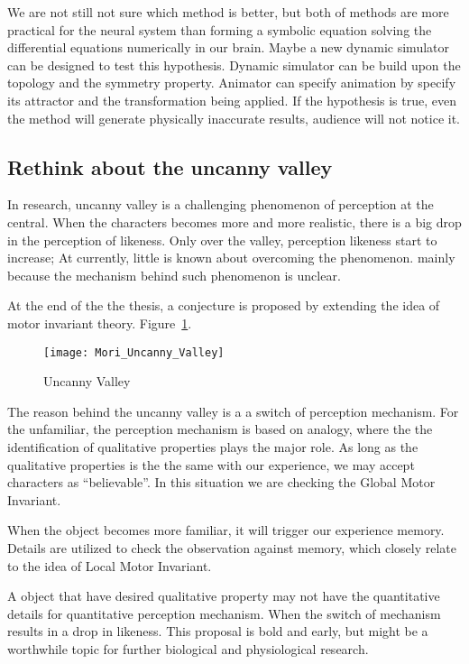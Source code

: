 We are not still not sure which method is better, but both of methods are more practical for the neural system than forming a symbolic equation solving the differential equations numerically in our brain.
Maybe a new dynamic simulator can be designed to test this hypothesis.
Dynamic simulator can be build upon the topology and the symmetry property.
Animator can specify animation by specify its attractor and the transformation being  applied.
If the hypothesis is true, even the method will generate physically inaccurate results, audience will not notice it.

\subsection{Rethink about the uncanny valley}
In \cms research, uncanny valley is a challenging phenomenon of perception at the  central. 
When the characters  becomes more and more realistic, there is a big drop in the perception of likeness.
Only over the valley, perception likeness start to increase;
At currently, little is known about overcoming the phenomenon.
mainly because the mechanism behind such phenomenon is unclear.

At the end of the the thesis, a conjecture is proposed by extending the idea of motor invariant theory.
Figure~\ref{fig:uncannyValley}.

\begin{figure}[!htbp]
  \begin{center}
      \texttt{[image: Mori\_Uncanny\_Valley]}
    \caption{Uncanny Valley}
    \label{fig:uncannyValley}
\end{center}
\end{figure}

The reason behind the uncanny valley is a  a switch of perception mechanism.
For the unfamiliar, the perception mechanism is based on analogy,
where the the identification of qualitative properties plays the major role.
As long as the qualitative properties is the the same with our experience, we may accept characters as ``believable''.
In this situation we are checking the Global Motor Invariant.

When the object becomes more familiar, it will trigger our experience memory.
Details are utilized to check the observation against memory,
which closely relate to the idea of Local Motor Invariant.


A object that have desired qualitative property may not have the quantitative details for quantitative perception mechanism.
When the switch of mechanism results in a drop in likeness.
This proposal is bold and early, but might be a worthwhile topic for further biological and physiological research.







